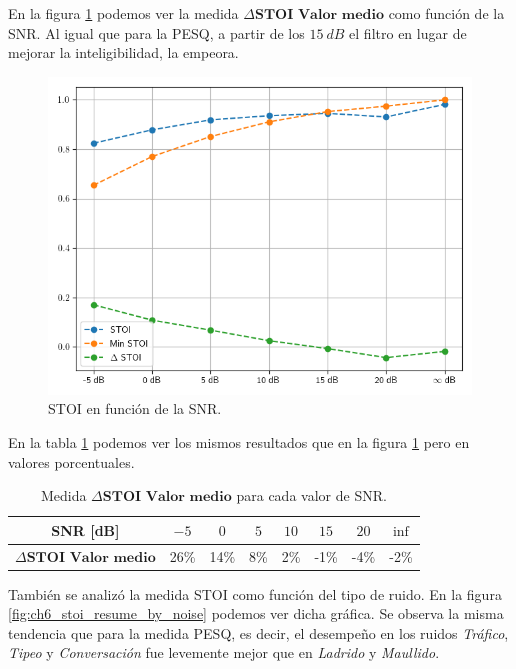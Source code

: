 En la figura \ref{fig:ch6_stoi_resume} podemos ver la medida $\Delta \textbf{STOI Valor medio}$ como función de la SNR. Al igual que para la PESQ, a partir de los $\SI{15}{dB}$ el filtro en lugar de mejorar la inteligibilidad, la empeora.

\begin{figure}
	\centering
	\centerline{\includegraphics[scale=0.75]{images/ch6/af/objective_metrics/metric_STOI.png}}
	\caption{STOI en función de la SNR.}
	\label{fig:ch6_stoi_resume}
\end{figure}

En la tabla \ref{table:stoi_resume} podemos ver los mismos resultados que en la figura \ref{fig:ch6_stoi_resume} pero en valores porcentuales.

\begin{table}[ht]
	\centering
	\begin{tabular}{ |c|c|c|c|c|c|c|c| } 
		\hline
		SNR [dB] & $-5$ & $0$ & $5$ & $10$ & $15$ & $20$ & $\inf$ \\ 
		\hline
		$\Delta \textbf{STOI Valor medio}$ & 26\%  & 14\%  & 8\% & 2\% & -1\% & -4\% & -2\% \\
		\hline
	\end{tabular}
	\caption{Medida $\Delta \textbf{STOI Valor medio}$ para cada valor de SNR.}
	\label{table:stoi_resume}
\end{table}

También se analizó la medida STOI como función del tipo de ruido. En la figura \ref{fig:ch6_stoi_resume_by_noise} podemos ver dicha gráfica. Se observa la misma tendencia que para la medida PESQ, es decir, el desempeño en los ruidos \emph{Tráfico}, \emph{Tipeo} y \emph{Conversación} fue levemente mejor que en \emph{Ladrido} y \emph{Maullido}.

